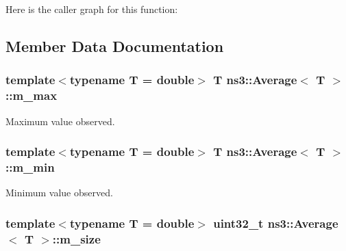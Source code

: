 Here is the caller graph for this function\+:




\subsection{Member Data Documentation}
\subsubsection[{\texorpdfstring{m\+\_\+max}{m_max}}]{\setlength{\rightskip}{0pt plus 5cm}template$<$typename T = double$>$ T {\bf ns3\+::\+Average}$<$ T $>$\+::m\+\_\+max\hspace{0.3cm}{\ttfamily [private]}}\hypertarget{classns3_1_1Average_a0a2491927f01c097ded6f798ecf49ba7}{}\label{classns3_1_1Average_a0a2491927f01c097ded6f798ecf49ba7}


Maximum value observed. 

\subsubsection[{\texorpdfstring{m\+\_\+min}{m_min}}]{\setlength{\rightskip}{0pt plus 5cm}template$<$typename T = double$>$ T {\bf ns3\+::\+Average}$<$ T $>$\+::m\+\_\+min\hspace{0.3cm}{\ttfamily [private]}}\hypertarget{classns3_1_1Average_a52a76e0aac81331ae4e05512e901b5ef}{}\label{classns3_1_1Average_a52a76e0aac81331ae4e05512e901b5ef}


Minimum value observed. 

\subsubsection[{\texorpdfstring{m\+\_\+size}{m_size}}]{\setlength{\rightskip}{0pt plus 5cm}template$<$typename T = double$>$ uint32\+\_\+t {\bf ns3\+::\+Average}$<$ T $>$\+::m\+\_\+size\hspace{0.3cm}{\ttfamily [private]}}\hypertarget{classns3_1_1Average_a4b64f80b73a52adc145b7712804dd5bc}{}\label{classns3_1_1Average_a4b64f80b73a52adc145b7712804dd5bc}


